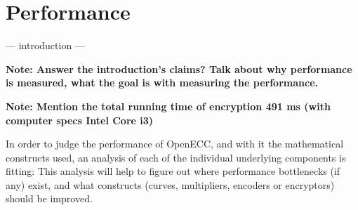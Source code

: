 \section{Performance}
\label{sec:performance}

 --- introduction ---
 
 \textbf{Note: Answer the introduction's claims? Talk about why performance is measured, what the goal is with measuring the
 performance.}
 
 \textbf{Note: Mention the total running time of encryption 491 ms (with computer specs Intel Core i3)}
 
 In order to judge the performance of OpenECC, and with it the mathematical constructs used, an analysis of each of the
 individual underlying components is fitting: This analysis will help to figure out where performance bottlenecks (if
 any) exist, and what constructs (curves, multipliers, encoders or encryptors) should be improved.



